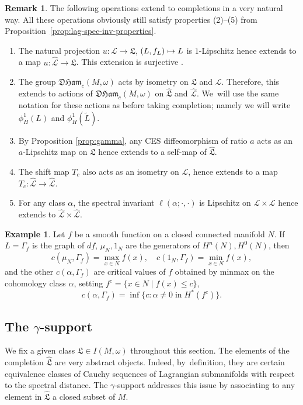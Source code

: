 \documentclass[10pt]{amsart}
\newcommand\mto{\mathchoice{\longmapsto}{\mapsto}{\mapsto}{\mapsto}}
\theoremstyle{definition}
\newtheorem{rem}[thm]{Remark}
\newtheorem{example}[thm]{Example}
\newcommand {\LL}{{\mathcal L}}
\newcommand{\DHam}{\mathfrak{DHam}}
\newcommand{\fL}{\mathfrak {L}}
\newcommand{\hatL}{\widehat{\fL}}
\newcommand{\hatLL}{\widehat{\LL}}
\begin{document}
\begin{rem}\label{rem:completions} The following operations extend to completions in a very natural way. All these operations obviously still satisfy properties (2)--(5) from Proposition~\ref{prop:lag-spec-inv-properties}.
\begin{enumerate}
\item The natural projection $u:\LL\to\fL$, $(L, f_L)\mto L$ is $1$-Lipschitz hence extends to a map $u:\hatLL\to\hatL$. This extension is surjective \cite[Prop.\,5.5]{Viterbo-gammas}.
\item The group $\DHam_c(M,\omega)$ acts by isometry on $\fL$ and $\LL$. Therefore, this extends to actions of $\DHam_c(M,\omega)$ on $\hatL$ and $\hatLL$. We~will use the same notation for these actions as before taking completion; namely we will write $\phi_H^1(L)$ and $\phi_H^1(\tilde L)$.
\item By Proposition \ref{prop:gamma}, any CES diffeomorphism of ratio $a$ acts as an $a$-Lipschitz map on $\fL$ hence extends to a self-map of $\hatL$.
\item The shift map $T_c$ also acts as an isometry on $\LL$, hence extends to a map $T_c:\hatLL\to\hatLL$.
\item For any class $\alpha$, the spectral invariant $\ell(\alpha;\cdot, \cdot)$ is Lipschitz on $\LL\times\LL$ hence extends to $\hatLL\times\hatLL$.
\end{enumerate}
\end{rem}
\begin{example}
Let $f$ be a smooth function on a closed connected manifold $N$. If~$L=\Gamma_f$ is the graph of $df$, $\mu_N, 1_N$ are the generators of $H^n(N), H^0(N)$, then
\[
c(\mu_N,\Gamma_{f})=\max_{x\in N}f(x),\quad c(1_N,\Gamma_{f})=\min_{x\in N}f(x),
\]
and the other $c(\alpha,\Gamma_{f})$ are critical values of $f$ obtained by minmax on the cohomology class $\alpha$, \ie setting $f^c=\{x\in N \mid f(x)\leq c\}$,
\[
c(\alpha,\Gamma_f)=\inf\{c : \alpha \neq 0\;\text{in}\; H^*(f^c)\}.
\]
\end{example}

\subsection{The \texorpdfstring{$\gamma$}{gamma}-support}\label{sec:gamma-support}

We fix a given class $\fL\in I(M,\omega)$ throughout this section. The elements of the completion $\hatL$ are very abstract objects. Indeed, by~definition, they are certain equivalence classes of Cauchy sequences of Lagrangian submanifolds with respect to the spectral distance. The $\gamma$\nobreakdash-support addresses this issue by associating to any element in $\hatL$ a closed subset of $M$.
\end{document}
